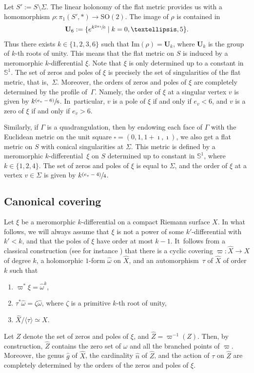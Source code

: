 \documentclass[11pt]{article}
\numberwithin{equation}{section}
\newenvironment{enumeratea}
{\bgroup\def\theenumi{\alph{enumi}}\begin{enumerate}}
{\end{enumerate}\egroup}
\newcommand{\psfrac}[2]{\sfrac{(#1)}{#2}}
\theoremstyle{plain}
\theoremstyle{definition}
\renewcommand{\S}{\mathbb{S}}
\newcommand{\Ub}{\mathbf{U}}
\let\Sig\Sigma
\let\G\Gamma
\begin{document}
Let $S':=S\setminus\Sigma$. The linear holonomy of the flat metric provides us with a homomorphism $\rho: \pi_1(S',*) \to \mathrm{SO}(2)$.
The image of $\rho$ is contained in
\[
\Ub_6:=\{e^{k\sfrac{2\pi\imath}{6}}\mid k=0,\dots,5\}.
\]
Thus there exists $k\in \{1,2,3,6\}$ such that $\mathrm{Im}(\rho)=\Ub_k$, where $\Ub_k$ is the group of $k$-th roots of unity.
This means that the flat metric on $S$ is induced by a meromorphic $k$-differential $\xi$.
Note that $\xi$ is only determined up to a constant in $\S^1$.
The set of zeros and poles of $\xi$ is precisely the set of singularities of the flat metric, that is,~$\Sigma$.
Moreover, the orders of zeros and poles of $\xi$ are completely determined by the profile of~$\G$.
Namely, the order of $\xi$ at a singular vertex $v$ is given by $k\psfrac{e_v-6}{6}$.
In~particular, $v$ is a pole of $\xi$ if and only if $e_v<6$, and $v$ is a zero of $\xi$ if and only if $e_v>6$.

Similarly, if $\G$ is a quadrangulation, then by endowing each face of $\G$ with the Euclidean metric on the unit square $\square=(0,1,1+\imath,\imath)$, we also get a flat metric on $S$ with conical singularities at $\Sig$. This metric is defined by a meromorphic $k$-differential~$\xi$ on $S$ determined up to constant in $\S^1$, where $k\in \{1,2,4\}$. The set of zeros and poles of $\xi$ is equal to $\Sigma$, and the order of $\xi$ at a vertex $v\in \Sigma$ is given by $k\psfrac{e_v-4}{4}$.

\subsection{Canonical covering}\label{sec:can:cov:kdiff}
Let $\xi$ be a meromorphic $k$-differential on a compact Riemann surface $X$. In what follows, we will always assume that $\xi$ is not a power of some $k'$-differential with $k'<k$, and that the poles of $\xi$ have order at most $k-1$. It~follows from a classical construction (see for instance \cite{EV92, BCGGM:kdiff, Ngu19}) that there is a cyclic covering $\varpi: \hat{X}\to X$ of degree $k$, a holomorphic $1$-form $\hat{\omega}$ on $\hat{X}$, and an automorphism~$\tau$ of $\hat{X}$ of order $k$ such that
\begin{enumeratea}
\item\label{enum:a}
$\varpi^*\xi=\hat{\omega}^k$,
\item\label{enum:b}
$\tau^*\hat{\omega}=\zeta\hat{\omega}$, where $\zeta$ is a primitive $k$-th root of unity,
\item\label{enum:c}
$\hat{X}/\langle \tau \rangle \simeq X$.
\end{enumeratea}
Let $Z$ denote the set of zeros and poles of $\xi$, and $\hat{Z}=\varpi^{-1}(Z)$. Then, by construction, $\hat{Z}$ contains the zero set of $\omega$ and all the branched points of $\varpi$.
Moreover, the genus $\hat{g}$ of $\hat{X}$, the cardinality $\hat{n}$ of $\hat{Z}$, and the action of $\tau$ on $\hat{Z}$ are completely determined by the orders of the zeros and poles of $\xi$.
\end{document}
